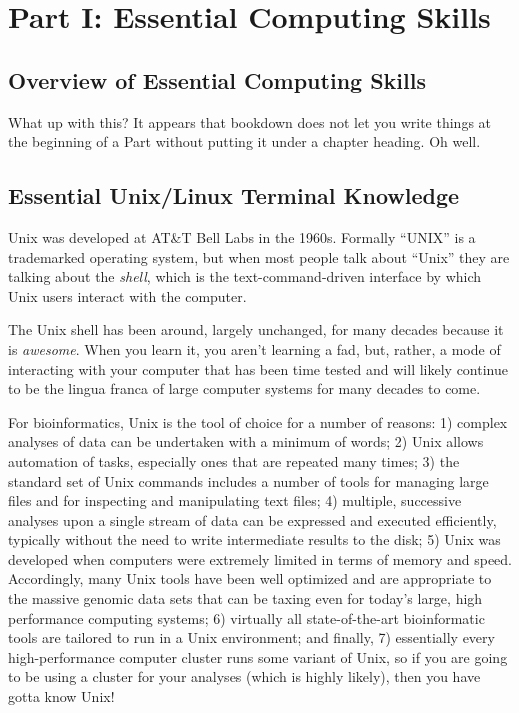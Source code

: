 \documentclass[]{krantz}
\begin{document}
\mainmatter

\hypertarget{part-part-i-essential-computing-skills}{%
\part{Part I: Essential Computing Skills}\label{part-part-i-essential-computing-skills}}

\hypertarget{overview-of-essential-computing-skills}{%
\chapter{Overview of Essential Computing Skills}\label{overview-of-essential-computing-skills}}

What up with this? It appears that bookdown does not let you
write things at the beginning of a Part without putting it under
a chapter heading. Oh well.

\hypertarget{essential-unixlinux-terminal-knowledge}{%
\chapter{Essential Unix/Linux Terminal Knowledge}\label{essential-unixlinux-terminal-knowledge}}

Unix was developed at AT\&T Bell Labs in the 1960s. Formally ``UNIX'' is a
trademarked operating system,
but when most people talk about ``Unix''
they are talking about the \emph{shell}, which is the text-command-driven interface
by which Unix users interact with the computer.

The Unix shell has been around, largely unchanged, for many decades because it is \emph{awesome}.
When you learn it, you aren't learning a fad, but, rather, a mode of interacting
with your computer that has been time tested and will likely
continue to be the lingua franca of large computer systems
for many decades to come.

For bioinformatics, Unix is the tool of choice for a number of reasons: 1) complex analyses
of data can be undertaken with a minimum of words; 2) Unix allows automation of tasks,
especially ones that are repeated many times; 3) the standard set of Unix commands includes
a number of tools for managing large files and for inspecting and manipulating text files; 4) multiple,
successive analyses upon a single stream of data can be expressed and executed efficiently,
typically without the need to write intermediate results to the disk;
5) Unix was developed when computers were extremely limited in terms of memory and speed. Accordingly,
many Unix tools have been well optimized and are appropriate to the massive genomic data sets
that can be taxing even for today's large, high performance computing systems; 6) virtually all state-of-the-art
bioinformatic tools are tailored to run in a Unix environment; and finally, 7) essentially
every high-performance computer cluster runs some variant of Unix, so if you are going to be
using a cluster for your analyses (which is highly likely), then you have gotta know Unix!
\end{document}
